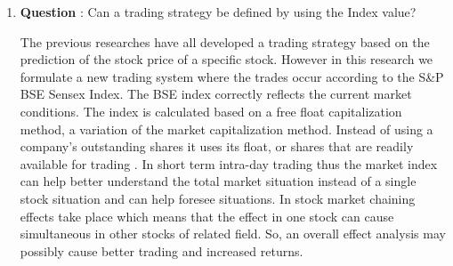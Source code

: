 \documentclass[a4paper,12bp]{report}
\begin{document}
\begin{enumerate}
\item \textbf{Question} : Can a trading strategy be defined by using the Index value?

The previous researches have all developed a trading strategy based on the prediction of the stock price of a specific stock. However in this research we formulate a new trading system where the trades occur according to the S\&P BSE Sensex Index. The BSE index correctly reflects the current market conditions. The index is calculated based on a free float capitalization method, a variation of the market capitalization method. Instead of using a company's outstanding shares it uses its float, or shares that are readily available for trading \cite{ wiki:20144}. In short term intra-day trading thus the market index can help better understand the total market situation instead of a single stock situation and can help foresee situations. In stock market chaining effects take place which means that the effect in one stock can cause simultaneous in other stocks of related field. So, an overall effect analysis may possibly cause better trading and increased returns. 
\end{enumerate}
\end{document}
